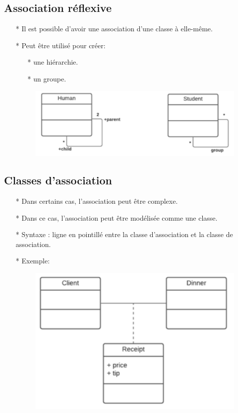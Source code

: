 \documentclass[12pt]{article}
\begin{document}
\subsection{Association réflexive}
\begin{itemize}
	\item[* ] Il est possible d'avoir une association d'une classe à elle-même.
	\item[* ] Peut être utilisé pour créer:
	\begin{itemize}
		\item[* ] une hiérarchie.
		\item[* ] un groupe.
	\end{itemize}
	\begin{figure}[!hbtp]
	\centering
	\includegraphics[scale=0.75]{Capture18.PNG}
\end{figure}
\end{itemize}
\subsection{Classes d'association}
\begin{itemize}
	\item[* ] Dans certains cas, l'association peut être complexe.
	\item[* ] Dans ce cas, l'association peut être modélisée comme une classe.
	\item[* ] Syntaxe : ligne en pointillé entre la classe d'association et la classe de
	association.
	\item[* ] Exemple:
	\begin{figure}[!hbtp]
		\centering
		\includegraphics[scale=0.75]{Capture19.PNG}
	\end{figure}
\end{itemize}
\end{document}
